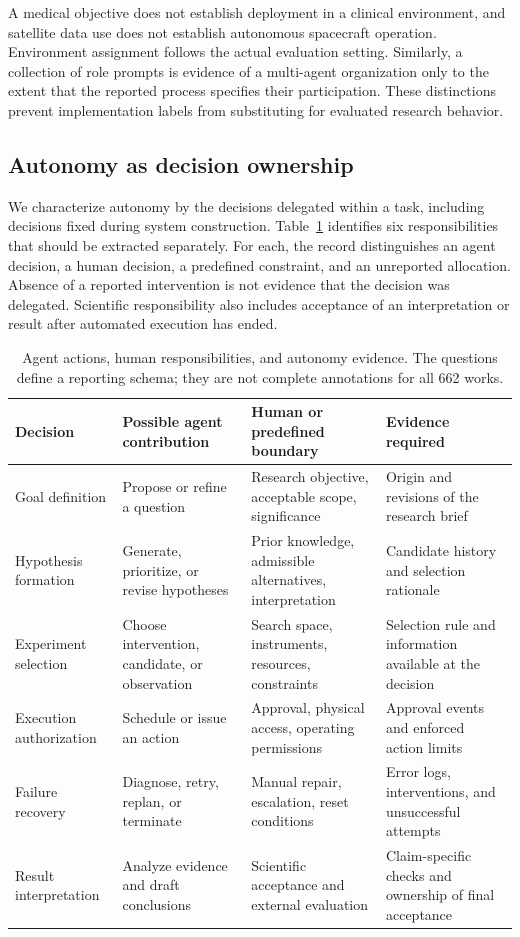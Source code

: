 A medical objective does not establish deployment in a clinical environment, and satellite data use does not establish autonomous spacecraft operation. Environment assignment follows the actual evaluation setting. Similarly, a collection of role prompts is evidence of a multi-agent organization only to the extent that the reported process specifies their participation. These distinctions prevent implementation labels from substituting for evaluated research behavior.

\subsection{Autonomy as decision ownership}

We characterize autonomy by the decisions delegated within a task, including decisions fixed during system construction. Table~\ref{tab:responsibilities} identifies six responsibilities that should be extracted separately. For each, the record distinguishes an agent decision, a human decision, a predefined constraint, and an unreported allocation. Absence of a reported intervention is not evidence that the decision was delegated. Scientific responsibility also includes acceptance of an interpretation or result after automated execution has ended.

\begin{table}[H]
\caption{Agent actions, human responsibilities, and autonomy evidence. The questions define a reporting schema; they are not complete annotations for all 662 works.}
\label{tab:responsibilities}
\scriptsize
\begin{tabularx}{\textwidth}{@{}p{}XXX@{}}
\toprule
Decision & Possible agent contribution & Human or predefined boundary & Evidence required \\
\midrule
Goal definition & Propose or refine a question & Research objective, acceptable scope, significance & Origin and revisions of the research brief \\
Hypothesis formation & Generate, prioritize, or revise hypotheses & Prior knowledge, admissible alternatives, interpretation & Candidate history and selection rationale \\
Experiment selection & Choose intervention, candidate, or observation & Search space, instruments, resources, constraints & Selection rule and information available at the decision \\
Execution authorization & Schedule or issue an action & Approval, physical access, operating permissions & Approval events and enforced action limits \\
Failure recovery & Diagnose, retry, replan, or terminate & Manual repair, escalation, reset conditions & Error logs, interventions, and unsuccessful attempts \\
Result interpretation & Analyze evidence and draft conclusions & Scientific acceptance and external evaluation & Claim-specific checks and ownership of final acceptance \\
\bottomrule
\end{tabularx}
\end{table}

